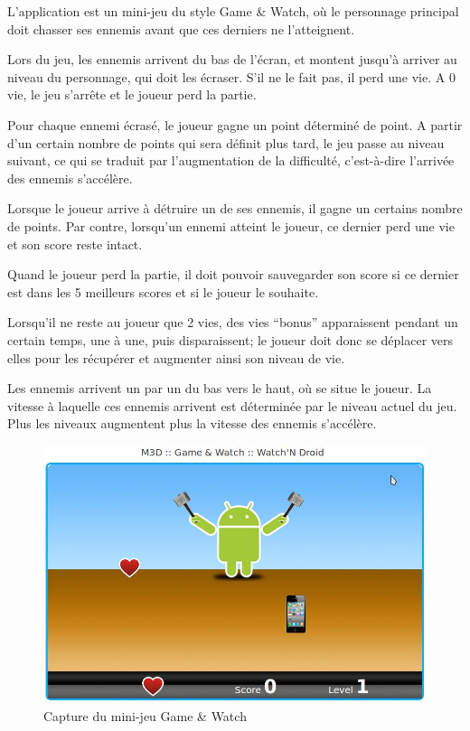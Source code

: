 L’application est un mini-jeu du style Game \& Watch, où le personnage principal doit chasser ses ennemis avant que ces derniers ne l’atteignent.

Lors du jeu, les ennemis arrivent du bas de l’écran, et montent jusqu’à arriver au niveau du personnage, qui doit les écraser. S’il ne le fait pas, 
il perd une vie. A 0 vie, le jeu s’arrête et le joueur perd la partie.

Pour chaque ennemi écrasé, le joueur gagne un point déterminé de point. A partir d’un certain nombre de points qui sera définit plus tard, 
le jeu passe au niveau suivant, ce qui se traduit par l’augmentation de la difficulté, c’est-à-dire l’arrivée des ennemis s’accélère.

Lorsque le joueur arrive à détruire un de ses ennemis, il gagne un certains nombre de points. Par contre, lorsqu’un ennemi atteint le joueur, 
ce dernier perd une vie et son score reste intact.

Quand le joueur perd la partie, il doit pouvoir sauvegarder son score si ce dernier est dans les 5 meilleurs scores et si le joueur le souhaite.

Lorsqu’il ne reste au joueur que 2 vies, des vies “bonus” apparaissent pendant un certain temps, une à une, puis disparaissent; 
le joueur doit donc se déplacer vers elles pour les récupérer et augmenter ainsi son niveau de vie.

Les ennemis arrivent un par un du bas vers le haut, où se situe le joueur. 
La vitesse à laquelle ces ennemis arrivent est déterminée par le niveau actuel du jeu. 
Plus les niveaux augmentent plus la vitesse des ennemis s’accélère.

\begin{figure}
 \includegraphics[width=\linewidth]{img/capturejeu_watchndroid}
 \caption{Capture du mini-jeu Game \& Watch}
 \label{fig:game_gamewatch}
\end{figure}

